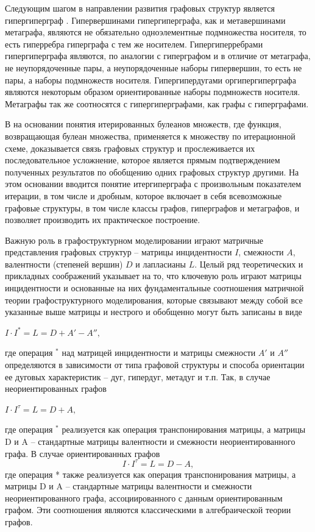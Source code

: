 Следующим шагом в направлении развития графовых структур является гипергиперграф \cite{BluminVLGTUOOG}. 
Гипервершинами гипергиперграфа, как и метавершинами метаграфа, являются не обязательно одноэлементные подмножества носителя, то есть гиперребра гиперграфа с тем же носителем. Гипергиперребрами гипергиперграфа являются, по аналогии с гиперграфом и в отличие от метаграфа, не неупорядоченные пары, а неупорядоченные наборы гипервершин, то есть не пары, а наборы подмножеств носителя. Гипергипердугами оргипергиперграфа являются некоторым образом ориентированные наборы подмножеств носителя. Метаграфы так же соотносятся с гипергиперграфами, как графы с гиперграфами.


В \cite{BluminIterGG} на основании понятия итерированных булеанов множеств, где функция, возвращающая булеан множества, применяется к множеству по итерационной схеме, доказывается связь графовых структур и прослеживается их последовательное усложнение, которое является прямым подтверждением полученных результатов по обобщению одних графовых структур другими. На этом основании вводится понятие итергиперграфа с произвольным показателем итерации, в том числе и дробным, которое включает в себя всевозможные графовые структуры, в том числе классы графов, гиперграфов и метаграфов, и позволяет производить их практическое построение.

Важную роль в графоструктурном моделировании играют матричные представления графовых структур -- матрицы инцидентности $I$, смежности $A$, валентности (степеней вершин) $D$ и лапласианы $L$. Целый ряд теоретических и прикладных соображений указывает на то, что ключевую роль играют матрицы инцидентности и основанные на них фундаментальные соотношения матричной теории графоструктурного моделирования, которые связывают между собой все указанные выше матрицы и нестрого и обобщенно могут быть записаны в виде
 \begin{center}
$I\cdot I^{*} = L = D + A' - A'',$ \\
\end{center}
где операция $^*$ над матрицей инцидентности и матрицы смежности $A'$ и $A''$ определяются в зависимости от типа графовой структуры и способа ориентации ее дуговых характеристик -- дуг, гипердуг, метадуг и т.п. Так, в случае неориентированных графов 
\\
\vspace{-0.6cm}
\begin{center}
$I\cdot I^{\tau} = L = D + A,$ \\
\end{center}
где операция $^*$ реализуется как операция транспонирования матрицы, а матрицы D и A -- стандартные матрицы валентности и смежности неориентированного графа. В случае ориентированных графов 
$$I\cdot I^{\tau} = L = D - A,$$
где операция * также реализуется как операция транспонирования матрицы, а матрицы D и A -- стандартные матрицы валентности и смежности неориентированного графа, ассоциированного с данным ориентированным графом. Эти соотношения являются классическими в алгебраической теории графов.

